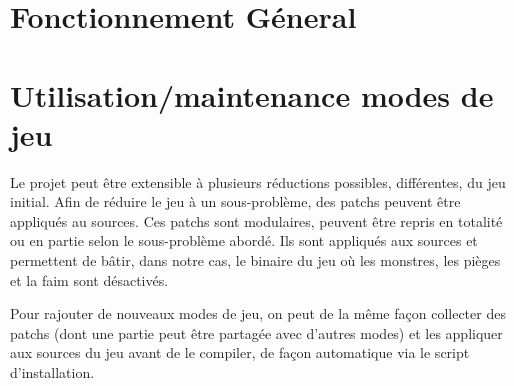 \section{Fonctionnement Géneral} 


\section{Utilisation/maintenance modes de jeu}

Le projet peut être extensible à plusieurs réductions possibles, différentes, du jeu initial. Afin de réduire le jeu à un sous-problème, des patchs peuvent être appliqués au sources. Ces patchs sont modulaires, peuvent être repris en totalité ou en partie selon le sous-problème abordé. Ils sont appliqués aux sources et permettent de bâtir, dans notre cas, le binaire du jeu où les monstres, les pièges et la faim sont désactivés.

Pour rajouter de nouveaux modes de jeu, on peut de la même façon collecter des patchs (dont une partie peut être partagée avec d'autres modes) et les appliquer aux sources du jeu avant de le compiler, de façon automatique via le script d'installation.


